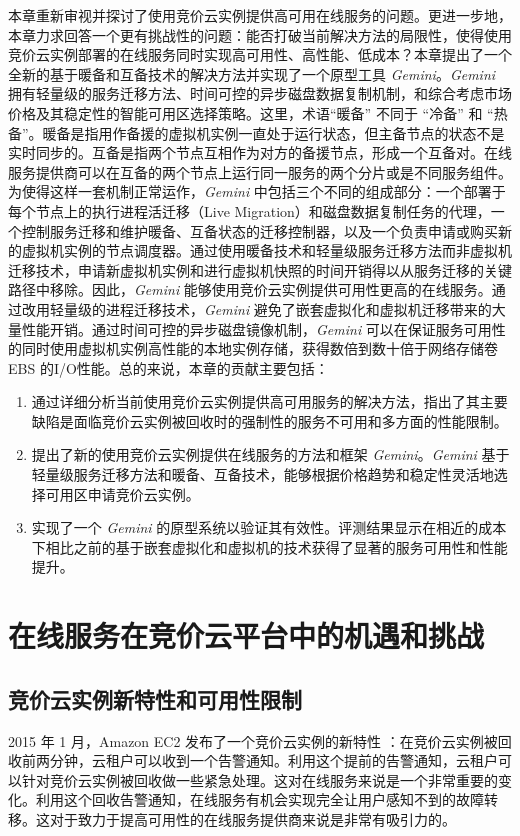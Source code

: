 本章重新审视并探讨了使用竞价云实例提供高可用在线服务的问题。更进一步地，本章力求回答一个更有挑战性的问题：能否打破当前解决方法的局限性，使得使用竞价云实例部署的在线服务同时实现高可用性、高性能、低成本？本章提出了一个全新的基于暖备和互备技术的解决方法并实现了一个原型工具 \emph{Gemini}。\emph{Gemini} 拥有轻量级的服务迁移方法、时间可控的异步磁盘数据复制机制，和综合考虑市场价格及其稳定性的智能可用区选择策略。这里，术语``暖备'' 不同于 ``冷备'' 和 ``热备''。暖备是指用作备援的虚拟机实例一直处于运行状态，但主备节点的状态不是实时同步的。互备是指两个节点互相作为对方的备援节点，形成一个互备对。在线服务提供商可以在互备的两个节点上运行同一服务的两个分片或是不同服务组件。为使得这样一套机制正常运作，\emph{Gemini} 中包括三个不同的组成部分：一个部署于每个节点上的执行进程活迁移（Live Migration）和磁盘数据复制任务的代理，一个控制服务迁移和维护暖备、互备状态的迁移控制器，以及一个负责申请或购买新的虚拟机实例的节点调度器。通过使用暖备技术和轻量级服务迁移方法而非虚拟机迁移技术，申请新虚拟机实例和进行虚拟机快照的时间开销得以从服务迁移的关键路径中移除。因此，\emph{Gemini} 能够使用竞价云实例提供可用性更高的在线服务。通过改用轻量级的进程迁移技术，\emph{Gemini} 避免了嵌套虚拟化和虚拟机迁移带来的大量性能开销。通过时间可控的异步磁盘镜像机制，\emph{Gemini} 可以在保证服务可用性的同时使用虚拟机实例高性能的本地实例存储，获得数倍到数十倍于网络存储卷 EBS 的I/O性能。总的来说，本章的贡献主要包括：
\begin{enumerate}
\item 通过详细分析当前使用竞价云实例提供高可用服务的解决方法，指出了其主要缺陷是面临竞价云实例被回收时的强制性的服务不可用和多方面的性能限制。
\item 提出了新的使用竞价云实例提供在线服务的方法和框架 \emph{Gemini}。\emph{Gemini} 基于轻量级服务迁移方法和暖备、互备技术，能够根据价格趋势和稳定性灵活地选择可用区申请竞价云实例。
\item 实现了一个 \emph{Gemini} 的原型系统以验证其有效性。评测结果显示在相近的成本下相比之前的基于嵌套虚拟化和虚拟机的技术获得了显著的服务可用性和性能提升。
\end{enumerate}

\section{在线服务在竞价云平台中的机遇和挑战}
\subsection{竞价云实例新特性和可用性限制}
2015 年 1 月，Amazon EC2 发布了一个竞价云实例的新特性 \cite{AWS_SITN:2016}：在竞价云实例被回收前两分钟，云租户可以收到一个告警通知。利用这个提前的告警通知，云租户可以针对竞价云实例被回收做一些紧急处理。这对在线服务来说是一个非常重要的变化。利用这个回收告警通知，在线服务有机会实现完全让用户感知不到的故障转移。这对于致力于提高可用性的在线服务提供商来说是非常有吸引力的。


